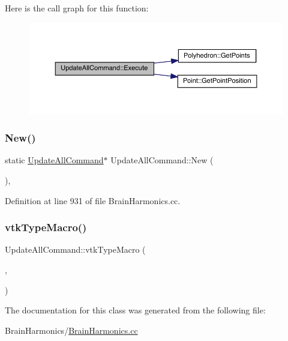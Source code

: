 Here is the call graph for this function\+:
\nopagebreak
\begin{figure}[H]
\begin{center}
\leavevmode
\includegraphics[width=350pt]{class_update_all_command_aa836cd5d538016289656d8118da879c5_cgraph}
\end{center}
\end{figure}
\mbox{\label{class_update_all_command_a97cd6ef1c68bb473aef27c898b175517}} 
\subsubsection{\texorpdfstring{New()}{New()}}
{\footnotesize\ttfamily static \hyperlink{class_update_all_command}{Update\+All\+Command}$\ast$ Update\+All\+Command\+::\+New (\begin{DoxyParamCaption}{ }\end{DoxyParamCaption})\hspace{0.3cm}{\ttfamily [inline]}, {\ttfamily [static]}}



Definition at line 931 of file Brain\+Harmonics.\+cc.

\mbox{\label{class_update_all_command_a228565b2a2306d425dc7eb3cda4d39a4}} 
\subsubsection{\texorpdfstring{vtk\+Type\+Macro()}{vtkTypeMacro()}}
{\footnotesize\ttfamily Update\+All\+Command\+::vtk\+Type\+Macro (\begin{DoxyParamCaption}\item[{\hyperlink{class_update_all_command}{Update\+All\+Command}}]{,  }\item[{vtk\+Command}]{ }\end{DoxyParamCaption})}



The documentation for this class was generated from the following file\+:\begin{DoxyCompactItemize}
\item 
Brain\+Harmonics/\hyperlink{_brain_harmonics_8cc}{Brain\+Harmonics.\+cc}\end{DoxyCompactItemize}
